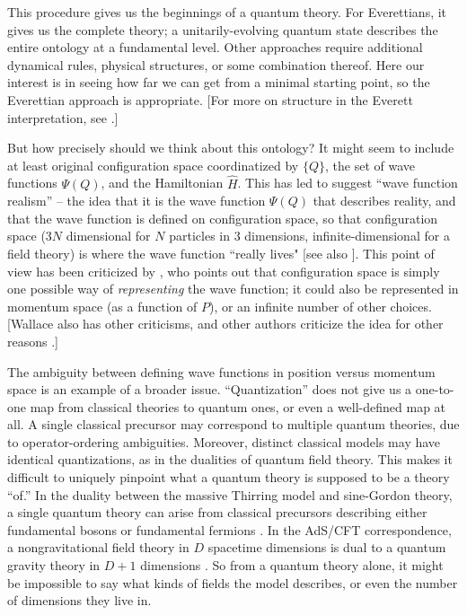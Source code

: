 \documentclass[12pt,english]{article}
\begin{document}
This procedure gives us the beginnings of a quantum theory.
For Everettians, it gives us the complete theory; a unitarily-evolving quantum state describes the entire ontology at a fundamental level.
Other approaches require additional dynamical rules, physical structures, or some combination thereof.
Here our interest is in seeing how far we can get from a minimal starting point, so the Everettian approach is appropriate.
[For more on structure in the Everett interpretation, see \citep{wallace2003everett,pittphilsci18772}.]

But how precisely should we think about this ontology?
It might seem to include at least original configuration space coordinatized by $\{Q\}$, the set of wave functions $\Psi(Q)$, and the Hamiltonian $\hat{H}$.
This has led \citet{albert1996} to suggest ``wave function realism'' -- the idea that it is the wave function $\Psi(Q)$ that describes reality, and that the wave function is defined on configuration space, so that configuration space  ($3N$ dimensional for $N$ particles in 3 dimensions, infinite-dimensional for a field theory) is where the wave function ``really lives" [see also \citep{ney2013,north2013}].
This point of view has been criticized by \citet{wallace2017}, who points out that configuration space is simply one possible way of \emph{representing} the wave function; it could also be represented in momentum space (as a function of $P$), or an infinite number of other choices.
[Wallace also has other criticisms, and other authors criticize the idea for other reasons \citep{allori2013,Myrvold:2015vly}.]

The ambiguity between defining wave functions in position versus momentum space is an example of a broader issue.
``Quantization'' does not give us a one-to-one map from classical theories to quantum ones, or even a well-defined map at all.
A single classical precursor may correspond to multiple quantum theories, due to operator-ordering ambiguities.
Moreover, distinct classical models may have identical quantizations, as in the dualities of quantum field theory.
This makes it difficult to uniquely pinpoint what a quantum theory is supposed to be a theory ``of.''
In the duality between the massive Thirring model and sine-Gordon theory, a single quantum theory can arise from classical precursors describing either fundamental bosons or fundamental fermions \citep{PhysRevD.11.2088}.
In the AdS/CFT correspondence, a nongravitational field theory in $D$ spacetime dimensions is dual to a quantum gravity theory in $D+1$ dimensions \citep{Maldacena:1997re}.
So from a quantum theory alone, it might be impossible to say what kinds of fields the model describes, or even the number of dimensions they live in.
\end{document}
